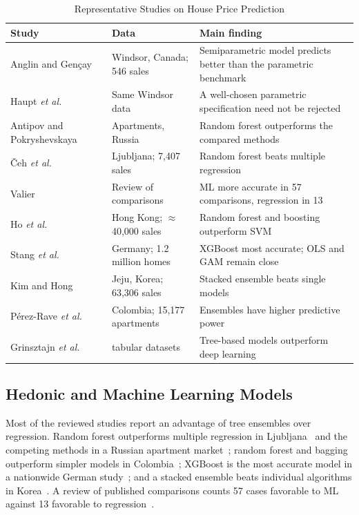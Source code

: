 \documentclass[conference]{IEEEtran}
\begin{document}
\begin{table}[t]
\caption{Representative Studies on House Price Prediction}
\label{tab:literature}
\centering
\footnotesize
\begin{tabular}{@{}>{\raggedright\arraybackslash}p{1.95cm}>{\raggedright\arraybackslash}p{2.1cm}>{\raggedright\arraybackslash}p{3.6cm}@{}}
\toprule
Study & Data & Main finding \\
\midrule
Anglin and Gen\c{c}ay~\cite{anglin1996} & Windsor, Canada; 546 sales & Semiparametric model predicts better than the parametric benchmark \\
Haupt \emph{et al.}~\cite{haupt2010} & Same Windsor data & A well-chosen parametric specification need not be rejected \\
Antipov and Pokryshevskaya~\cite{antipov2012} & Apartments, Russia & Random forest outperforms the compared methods \\
\v{C}eh \emph{et al.}~\cite{ceh2018} & Ljubljana; 7,407 sales & Random forest beats multiple regression \\
Valier~\cite{valier2020} & Review of comparisons & ML more accurate in 57 comparisons, regression in 13 \\
Ho \emph{et al.}~\cite{ho2021} & Hong Kong; $\approx$40,000 sales & Random forest and boosting outperform SVM \\
Stang \emph{et al.}~\cite{stang2022} & Germany; 1.2 million homes & XGBoost most accurate; OLS and GAM remain close \\
Kim and Hong~\cite{kim2024} & Jeju, Korea; 63,306 sales & Stacked ensemble beats single models \\
P\'erez-Rave \emph{et al.}~\cite{perezrave2020} & Colombia; 15,177 apartments & Ensembles have higher predictive power \\
Grinsztajn \emph{et al.}~\cite{grinsztajn2022} & 45 tabular datasets & Tree-based models outperform deep learning \\
\bottomrule
\end{tabular}
\end{table}

\subsection{Hedonic and Machine Learning Models}

Most of the reviewed studies report an advantage of tree ensembles over regression. Random forest outperforms multiple regression in Ljubljana~\cite{ceh2018} and the competing methods in a Russian apartment market~\cite{antipov2012}; random forest and bagging outperform simpler models in Colombia~\cite{perezrave2020}; XGBoost is the most accurate model in a nationwide German study~\cite{stang2022}; and a stacked ensemble beats individual algorithms in Korea~\cite{kim2024}. A review of published comparisons counts 57 cases favorable to ML against 13 favorable to regression~\cite{valier2020}.
\end{document}
